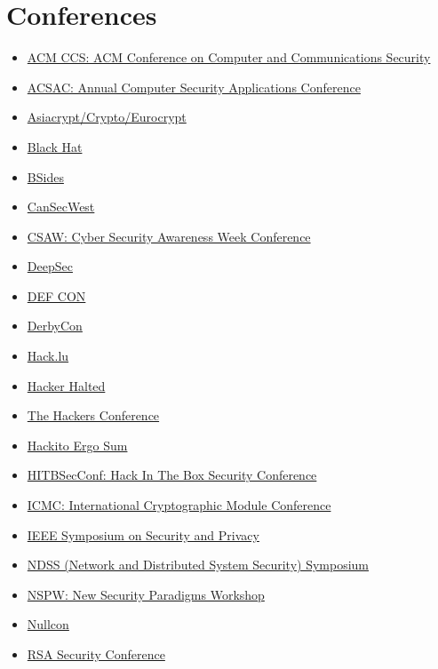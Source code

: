 \documentclass[a4paper, 12pt, titlepage]{report}
\begin{document}
\section{Conferences}
\begin{multicols}{2}
\begin{itemize}
\item \href{http://www.sigsac.org/ccs/}{ACM CCS: ACM Conference on Computer and Communications Security}
\item \href{https://www.acsac.org/}{ACSAC: Annual Computer Security Applications Conference}
\item \href{https://www.iacr.org/conferences/}{Asiacrypt/Crypto/Eurocrypt}
\item \href{https://www.blackhat.com/}{Black Hat}
\item \href{http://www.securitybsides.com/w/page/12194156/FrontPage}{BSides}
\item \href{https://cansecwest.com/}{CanSecWest}
\item \href{https://csaw.isis.poly.edu/}{CSAW: Cyber Security Awareness Week Conference}
\item \href{https://www.deepsec.net/}{DeepSec}
\item \href{https://www.defcon.org/index.html}{DEF CON}
\item \href{https://www.derbycon.com/}{DerbyCon}
\item \href{https://2018.hack.lu/}{Hack.lu}
\item \href{https://www.hackerhalted.com/}{Hacker Halted}
\item \href{http://thehackersconference.com/}{The Hackers Conference}
\item \href{http://2015.hackitoergosum.org/}{Hackito Ergo Sum}
\item \href{https://conference.hitb.org/}{HITBSecConf: Hack In The Box Security Conference}
\item \href{https://icmconference.org/}{ICMC: International Cryptographic Module Conference}
\item \href{https://www.ieee-security.org/}{IEEE Symposium on Security and Privacy}
\item \href{https://www.ndss-symposium.org/}{NDSS (Network and Distributed System Security) Symposium}
\item \href{https://www.nspw.org/}{NSPW: New Security Paradigms Workshop}
\item \href{https://nullcon.net/website/}{Nullcon}
\item \href{https://www.rsaconference.com/}{RSA Security Conference}

\end{itemize}
\end{multicols}
\end{document}
